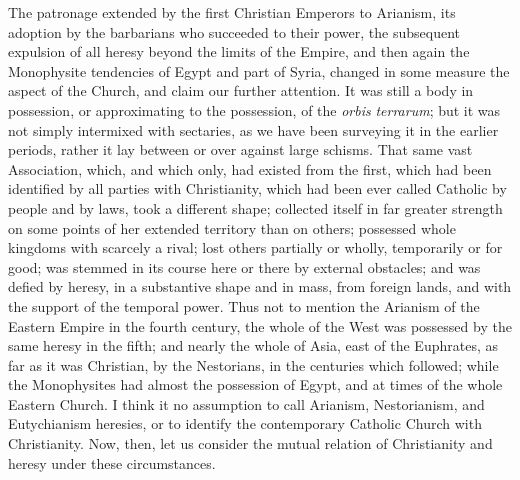 The patronage extended by the first Christian Emperors to Arianism,
its adoption by the barbarians who succeeded to their power, the
subsequent expulsion of all heresy beyond the limits of the Empire,
and then again the Monophysite tendencies of Egypt and part of Syria,
changed in some measure the aspect of the Church, and claim our
further attention. It was still a body in possession, or approximating
to the possession, of the \emph{orbis} \emph{terrarum}; but it was not
simply intermixed with sectaries, as we have been surveying it in the
earlier periods, rather it lay between or over against large schisms.
That same vast Association, which, and which only, had existed from
the first, which had been identified by all parties with Christianity,
which had been ever called Catholic by people and by laws, took a
different shape; collected itself in far greater strength on some
points of her extended territory than on others; possessed whole
kingdoms with scarcely a rival; lost others partially or wholly,
temporarily or for good; was stemmed in its course here or there by
external obstacles; and was defied by heresy, in a substantive shape
and in mass, from foreign lands, and with the support of the temporal
power. Thus not to mention the Arianism of the Eastern Empire in the
fourth century, the whole of the West was possessed by the same heresy
in the fifth; and nearly the whole of Asia, east of the Euphrates, as
far as it was Christian, by the Nestorians, in the centuries which
followed; while the Monophysites had almost the possession of Egypt,
and at times of the whole Eastern Church. I think it no assumption to
call Arianism, Nestorianism, and Eutychianism heresies, or to identify
the contemporary Catholic Church with Christianity. Now, then, let us
consider the mutual relation of Christianity and heresy under these
circumstances.


